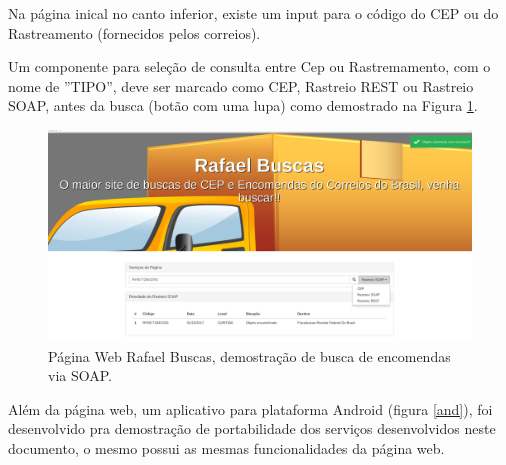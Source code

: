 \documentclass[journal]{IEEEtran}
\begin{document}
Na página inical no canto inferior, existe um input para o código do CEP ou do Rastreamento (fornecidos pelos correios).

Um componente para seleção de consulta entre Cep ou Rastremamento, com o nome de ''TIPO'', deve ser marcado como CEP, Rastreio REST ou Rastreio SOAP, antes da busca (botão com uma lupa) como demostrado na Figura \ref{c2}.

\begin{figure}[H]
	\centering
	\includegraphics[scale=0.23]{Imagens/c2.jpg}
	\caption{Página Web Rafael Buscas, demostração de busca de encomendas via SOAP.}
	\label{c2}
\end{figure}

Além da página web, um aplicativo para plataforma Android (figura \ref{and}), foi desenvolvido pra demostração de portabilidade dos serviços desenvolvidos neste documento, o mesmo possui as mesmas funcionalidades da página web.
\end{document}
